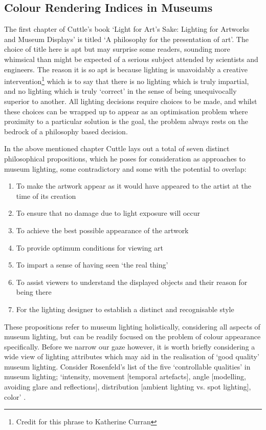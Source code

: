 \subsection{Colour Rendering Indices in Museums}

The first chapter of Cuttle's book `Light for Art's Sake: Lighting for Artworks and Museum Displays' \citep{cuttle_light_2007} is titled `A philosophy for the presentation of art'. The choice of title here is apt but may surprise some readers, sounding more whimsical than might be expected of a serious subject attended by scientists and engineers. The reason it is so apt is because lighting is unavoidably a creative intervention\footnote{Credit for this phrase to Katherine Curran} which is to say that there is no lighting which is truly impartial, and no lighting which is truly `correct' in the sense of being unequivocally superior to another. All lighting decisions require choices to be made, and whilst these choices can be wrapped up to appear as an optimisation problem where proximity to a particular solution is the goal, the problem always rests on the bedrock of a philosophy based decision.

In the above mentioned chapter Cuttle lays out a total of seven distinct philosophical propositions, which he poses for consideration as approaches to museum lighting, some contradictory and some with the potential to overlap:

\begin{enumerate}
\item To make the artwork appear as it would have appeared to the artist at the time of its creation
\item To ensure that no damage due to light exposure will occur
\item To achieve the best possible appearance of the artwork
\item To provide optimum conditions for viewing art
\item To impart a sense of having seen `the real thing'
\item To assist viewers to understand the displayed objects and their reason for being there
\item For the lighting designer to establish a distinct and recognisable style
\end{enumerate}

These propositions refer to museum lighting holistically, considering all aspects of museum lighting, but can be readily focused on the problem of colour appearance specifically. Before we narrow our gaze however, it is worth briefly considering a wide view of lighting attributes which may aid in the realisation of `good quality' museum lighting. Consider Rosenfeld's list of the five `controllable qualities' in museum lighting; `intensity, movement [temporal artefacts], angle [modelling, avoiding glare and reflections], distribution [ambient lighting vs. spot lighting], color' \citep{rosenfeld_agony_2013}.

